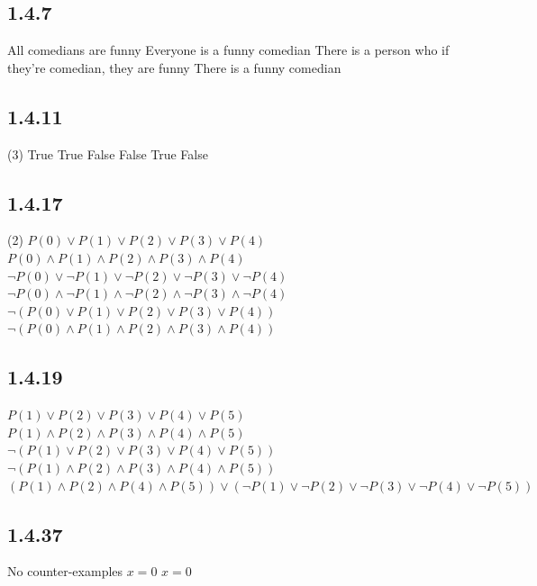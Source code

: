 \documentclass[12pt,titlepage]{extarticle}
\begin{document}
\subsection*{1.4.7}
\begin{tasks}
    \task All comedians are funny
    \task Everyone is a funny comedian
    \task There is a person who if they're comedian, they are funny
    \task There is a funny comedian
\end{tasks}

\subsection*{1.4.11}
\begin{tasks}(3)
    \task True
    \task True
    \task False
    \task False
    \task True
    \task False
\end{tasks}

\subsection*{1.4.17}
\begin{tasks}(2)
    \task $P(0) \lor P(1) \lor P(2) \lor P(3) \lor P(4)$
    \task $P(0) \land P(1) \land P(2) \land P(3) \land P(4)$
    \task $\lnot P(0) \lor \lnot P(1) \lor \lnot P(2) \lor \lnot P(3) \lor \lnot P(4)$
    \task $\lnot P(0) \land \lnot P(1) \land \lnot P(2) \land \lnot P(3) \land \lnot P(4)$
    \task $\lnot (P(0) \lor P(1) \lor P(2) \lor P(3) \lor P(4))$
    \task $\lnot (P(0) \land P(1) \land P(2) \land P(3) \land P(4))$
\end{tasks}

\subsection*{1.4.19}
\begin{tasks}
    \task $P(1) \lor P(2) \lor P(3) \lor P(4) \lor P(5)$
    \task $P(1) \land P(2) \land P(3) \land P(4) \land P(5)$
    \task $\lnot (P(1) \lor P(2) \lor P(3) \lor P(4) \lor P(5))$
    \task $\lnot (P(1) \land P(2) \land P(3) \land P(4) \land P(5))$
    \task $(P(1) \land P(2) \land P(4) \land P(5)) \lor (\lnot P(1) \lor \lnot P(2) \lor \lnot P(3) \lor \lnot P(4) \lor \lnot P(5))$
\end{tasks}

\subsection*{1.4.37}
\begin{tasks}
    \task No counter-examples
    \task $x = 0$
    \task $x = 0$
\end{tasks}
\end{document}
